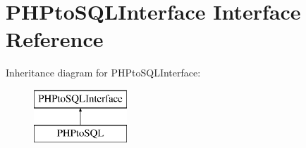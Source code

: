 \hypertarget{interface_p_h_pto_s_q_l_interface}{}\section{P\+H\+Pto\+S\+Q\+L\+Interface Interface Reference}
\label{interface_p_h_pto_s_q_l_interface}
Inheritance diagram for P\+H\+Pto\+S\+Q\+L\+Interface\+:\begin{figure}[H]
\begin{center}
\leavevmode
\includegraphics[height=2.000000cm]{interface_p_h_pto_s_q_l_interface}
\end{center}
\end{figure}
